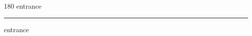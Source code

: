 
\begin{frame}
\begin{center}
\begin{turn}{180}
{\fontsize{2.5cm}{1em}\selectfont entrance}
\end{turn}
\vspace{1em}\par  
\hrule
\vspace{1em}\par  
{\fontsize{2.5cm}{1em}\selectfont entrance}
\end{center}
\end{frame}
